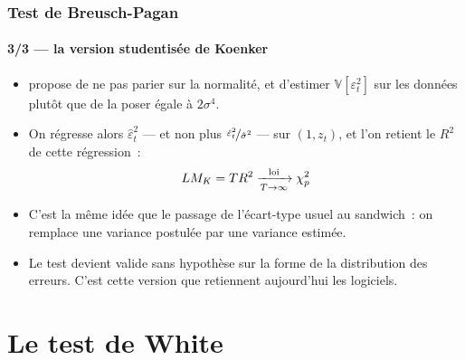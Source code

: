 \documentclass[10pt]{beamer}
\begin{document}
\begin{frame}
  \frametitle{Test de Breusch-Pagan}
  \framesubtitle{3/3 --- la version studentisée de Koenker}

  \begin{itemize}

  \item \cite{Koenker1981} propose de ne pas parier sur la normalité, et
    d'estimer $\mathbb V[\varepsilon_t^2]$ sur les données plutôt que de la
    poser égale à $2\sigma^4$.\newline

  \item On régresse alors $\hat\varepsilon_t^2$ — et non plus
    $\nicefrac{\hat\varepsilon_t^2}{\hat\sigma^2}$ — sur $(1, z_t)$, et l'on
    retient le $R^2$ de cette régression~:
    \[
      LM_K = T R^2 \xrightarrow[T\rightarrow\infty]{\text{loi}} \chi^2_p
    \]

  \item C'est la même idée que le passage de l'écart-type usuel au sandwich~:
    on remplace une variance postulée par une variance estimée.\newline

  \item[$\Rightarrow$] Le test devient valide sans hypothèse sur la forme de la
    distribution des erreurs. C'est cette version que retiennent aujourd'hui les
    logiciels.\newline

  \end{itemize}


\end{frame}


\section{Le test de White}
\end{document}
